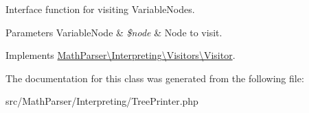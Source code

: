 Interface function for visiting Variable\-Nodes. 


\begin{DoxyParams}[1]{Parameters}
Variable\-Node & {\em \$node} & Node to visit. \\
\hline
\end{DoxyParams}


Implements \hyperlink{interfaceMathParser_1_1Interpreting_1_1Visitors_1_1Visitor_a292630a7204dadd96877d8182f38deb0}{Math\-Parser\textbackslash{}\-Interpreting\textbackslash{}\-Visitors\textbackslash{}\-Visitor}.



The documentation for this class was generated from the following file\-:\begin{DoxyCompactItemize}
\item 
src/\-Math\-Parser/\-Interpreting/Tree\-Printer.\-php\end{DoxyCompactItemize}
